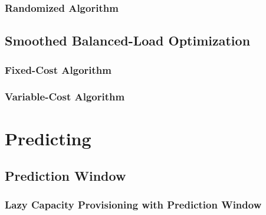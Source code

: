 \subsubsection{Randomized Algorithm}

\subsection{Smoothed Balanced-Load Optimization}

\subsubsection{Fixed-Cost Algorithm}

\subsubsection{Variable-Cost Algorithm}

\section{Predicting}

\subsection{Prediction Window}

\subsubsection{Lazy Capacity Provisioning with Prediction Window}
